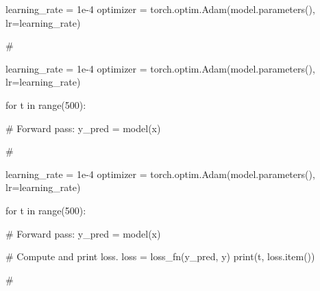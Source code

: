 \documentclass{beamer}
\begin{document}
\begin{frame}[fragile ]
\begin{pythoncode}
learning_rate = 1e-4
optimizer = torch.optim.Adam(model.parameters(), lr=learning_rate)




















#
\end{pythoncode}
\vfill

\end{frame}

\begin{frame}[fragile ]
\begin{pythoncode}
learning_rate = 1e-4
optimizer = torch.optim.Adam(model.parameters(), lr=learning_rate)

for t in range(500):

  # Forward pass: 
  y_pred = model(x)















#
\end{pythoncode}
\vfill
\end{frame}


\begin{frame}[fragile ]
\begin{pythoncode}
learning_rate = 1e-4
optimizer = torch.optim.Adam(model.parameters(), lr=learning_rate)

for t in range(500):

  # Forward pass: 
  y_pred = model(x)

  # Compute and print loss.
  loss = loss_fn(y_pred, y)
  print(t, loss.item())
  










#
\end{pythoncode}
\vfill
\end{frame}
\end{document}
